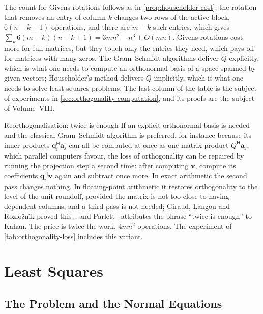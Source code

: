 The count for Givens rotations follows as in \cref{prop:householder-cost}: the rotation that removes an entry of column $k$ changes two rows of the active block, $6(n-k+1)$ operations, and there are $m-k$ such entries, which gives $\sum_k6(m-k)(n-k+1)=3mn^2-n^3+O(mn)$. Givens rotations cost more for full matrices, but they touch only the entries they need, which pays off for matrices with many zeros. The Gram--Schmidt algorithms deliver $Q$ explicitly, which is what one needs to compute an orthonormal basis of a space spanned by given vectors; Householder's method delivers $Q$ implicitly, which is what one needs to solve least squares problems. The last column of the table is the subject of experiments in \cref{sec:orthogonality-computation}, and its proofs are the subject of Volume~VIII.

\begin{note}{Reorthogonalisation: twice is enough}
If an explicit orthonormal basis is needed and the classical Gram--Schmidt algorithm is preferred, for instance because its inner products $\mathbf q_i^{\mathsf H}\mathbf a_j$ can all be computed at once as one matrix product $Q^{\mathsf H}\mathbf a_j$, which parallel computers favour, the loss of orthogonality can be repaired by running the projection step a second time: after computing $\mathbf v$, compute its coefficients $\mathbf q_i^{\mathsf H}\mathbf v$ again and subtract once more. In exact arithmetic the second pass changes nothing. In floating-point arithmetic it restores orthogonality to the level of the unit roundoff, provided the matrix is not too close to having dependent columns, and a third pass is not needed; Giraud, Langou and Rozlo\v{z}n\'{\i}k proved this~\cite{giraud2005camwa}, and Parlett~\cite{parlett1998} attributes the phrase ``twice is enough'' to Kahan. The price is twice the work, $4mn^2$ operations. The experiment of \cref{tab:orthogonality-loss} includes this variant.
\end{note}

\section{Least Squares}
\label{sec:least-squares}

\subsection{The Problem and the Normal Equations}

